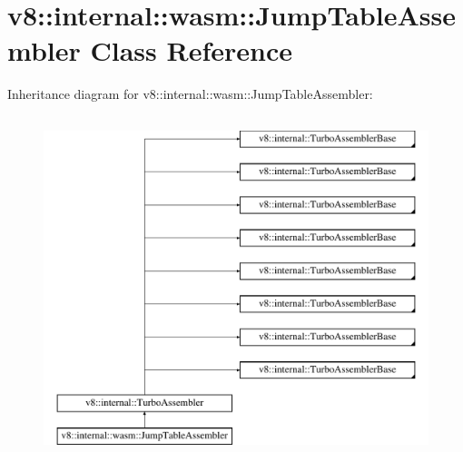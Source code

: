 \hypertarget{classv8_1_1internal_1_1wasm_1_1JumpTableAssembler}{}\section{v8\+:\+:internal\+:\+:wasm\+:\+:Jump\+Table\+Assembler Class Reference}
\label{classv8_1_1internal_1_1wasm_1_1JumpTableAssembler}
Inheritance diagram for v8\+:\+:internal\+:\+:wasm\+:\+:Jump\+Table\+Assembler\+:\begin{figure}[H]
\begin{center}
\leavevmode
\includegraphics[height=10.000000cm]{classv8_1_1internal_1_1wasm_1_1JumpTableAssembler}
\end{center}
\end{figure}
